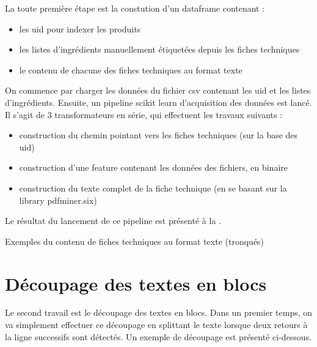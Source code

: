         La toute première étape est la constution d'un dataframe contenant : 
        \begin{itemize}
            \item les uid pour indexer les produits
            \item les listes d'ingrédients manuellement étiquetées depuis les fiches techniques
            \item le contenu de chacune des fiches techniques au format texte
        \end{itemize}
        On commence par charger les données du fichier csv contenant les uid et les listes d'ingrédients.
        Ensuite, un pipeline scikit learn d'acquisition des données est lancé.
        Il s'agit de 3 transformateurs en série, qui effectuent les travaux suivants :
        \begin{itemize}
            \item construction du chemin pointant vers les fiches techniques (sur la base des uid)
            \item construction d'une feature contenant les données des fichiers, en binaire
            \item construction du texte complet de la fiche technique (en se basant sur la library pdfminer.six)
        \end{itemize}
        Le résultat du lancement de ce pipeline est présenté à la .

        {\renewcommand{\arraystretch}{1.5}%
        \begin{table}[htbp]
            \begin{center}
            {\scriptsize
            
            }
            \caption{Exemples du contenu de fiches techniques au format texte (tronqués)}
            \label{tbl:mod_GT_fulltexts}
            \end{center}
        \end{table}
        }        

        \section{Découpage des textes en blocs}

        Le second travail est le découpage des textes en blocs. 
        Dans un premier temps, on va simplement effectuer ce découpage en splittant le texte lorsque deux retours à la ligne successifs sont détectés.
        Un exemple de découpage est présenté ci-dessous.

